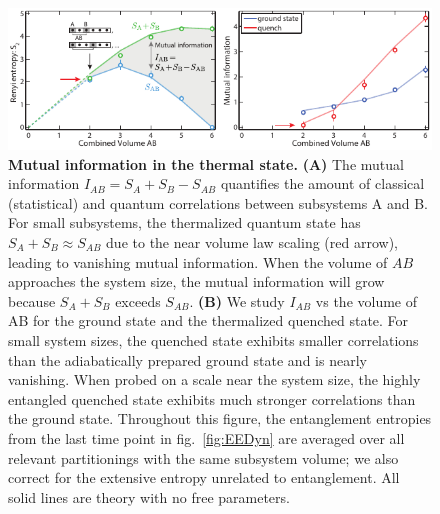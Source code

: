 \begin{figure}[t]
	\centering
	\includegraphics[scale=1.4]{figures/ETH_MI.pdf}
	\caption{{\bf Mutual information in the thermal state. } {\bf (A)} The mutual information $I_{AB} = S_A + S_B - S_{AB}$ quantifies the amount of classical (statistical) and quantum correlations between subsystems A and B. For small subsystems, the thermalized quantum state has $S_A + S_B \approx S_{AB}$ due to the near volume law scaling (red arrow), leading to vanishing mutual information. When the volume of $AB$ approaches the system size, the mutual information will grow because $S_A + S_B$ exceeds $S_{AB}$. {\bf (B)} We study $I_{AB}$ vs the volume of AB for the ground state and the thermalized quenched state. For small system sizes, the quenched state exhibits smaller correlations than the adiabatically prepared ground state and is nearly vanishing. When probed on a scale near the system size, the highly entangled quenched state exhibits much stronger correlations than the ground state. Throughout this figure, the entanglement entropies from the last time point in fig.~\ref{fig:EEDyn} are averaged over all relevant partitionings with the same subsystem volume; we also correct for the extensive entropy unrelated to entanglement. All solid lines are theory with no free parameters.}
	\label{fig:MI}
\end{figure} 


